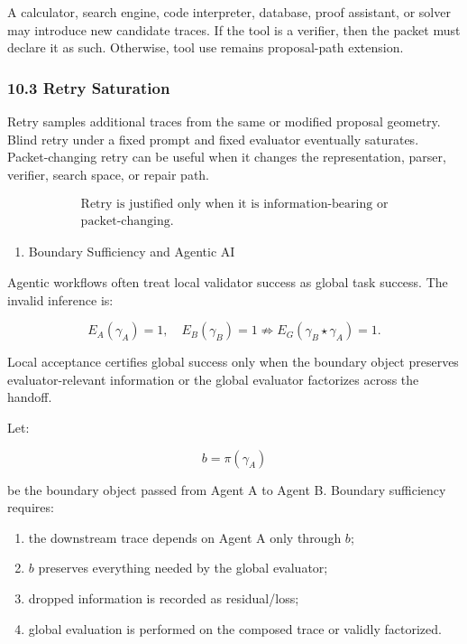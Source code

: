 \documentclass[
  10pt,
]{article}
\providecommand{\tightlist}{%
  \setlength{\itemsep}{0pt}\setlength{\parskip}{0pt}}
\providecommand{\tightlist}{%
  \setlength{\itemsep}{0pt}\setlength{\parskip}{0pt}}
\begin{document}
A calculator, search engine, code interpreter, database, proof assistant, or solver may introduce new candidate traces. If the tool is a verifier, then the packet must declare it as such. Otherwise, tool use remains proposal-path extension.

\subsubsection{10.3 Retry Saturation}\label{retry-saturation}

Retry samples additional traces from the same or modified proposal geometry. Blind retry under a fixed prompt and fixed evaluator eventually saturates. Packet-changing retry can be useful when it changes the representation, parser, verifier, search space, or repair path.

\protect\hypertarget{math-E0140-0187}{}{\[
\boxed{
\begin{gathered}\text{Retry is justified only when it is information-bearing or}\\
\text{packet-changing.}\end{gathered}
}
\]}

\begin{enumerate}
\def\labelenumi{\arabic{enumi}.}
\setcounter{enumi}{10}
\tightlist
\item
  Boundary Sufficiency and Agentic AI
\end{enumerate}

Agentic workflows often treat local validator success as global task success. The invalid inference is:

\protect\hypertarget{math-E0141-0188}{}{\[
E_A(\gamma_A)=1,\quad E_B(\gamma_B)=1
\not\Rightarrow
E_G(\gamma_B\star\gamma_A)=1.
\]}

Local acceptance certifies global success only when the boundary object preserves evaluator-relevant information or the global evaluator factorizes across the handoff.

Let:

\protect\hypertarget{math-E0142-0189}{}{\[
b=\pi(\gamma_A)
\]}

be the boundary object passed from Agent A to Agent B. Boundary sufficiency requires:

\begin{enumerate}
\def\labelenumi{\arabic{enumi}.}
\tightlist
\item
  the downstream trace depends on Agent A only through \protect\hypertarget{math-E0143-0190}{}{\(b\)};
\item
  \protect\hypertarget{math-E0143-0191}{}{\(b\)} preserves everything needed by the global evaluator;
\item
  dropped information is recorded as residual/loss;
\item
  global evaluation is performed on the composed trace or validly factorized.
\end{enumerate}
\end{document}
